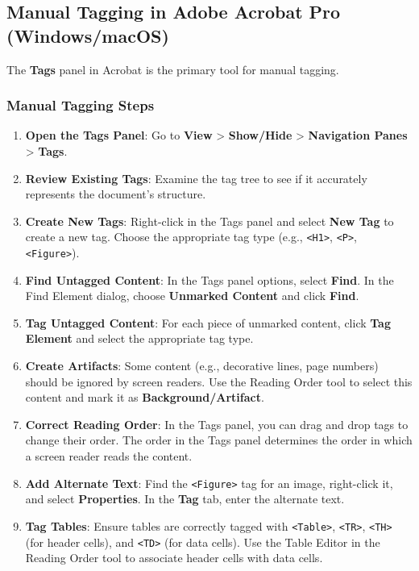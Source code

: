 \subsection{Manual Tagging in Adobe Acrobat Pro (Windows/macOS)}
\label{subsec:manual-tagging-acrobat}
The \textbf{Tags} panel in Acrobat is the primary tool for manual tagging.

\subsubsection{Manual Tagging Steps}
\label{ssubsec:manual-tagging-steps}
\begin{enumerate}
	\item \textbf{Open the Tags Panel}: Go to \textbf{View} > \textbf{Show/Hide} > \textbf{Navigation Panes} > \textbf{Tags}.
	\item \textbf{Review Existing Tags}: Examine the tag tree to see if it accurately represents the document's structure.
	\item \textbf{Create New Tags}: Right-click in the Tags panel and select \textbf{New Tag} to create a new tag. Choose the appropriate tag type (e.g., \texttt{<H1>}, \texttt{<P>}, \texttt{<Figure>}).
	\item \textbf{Find Untagged Content}: In the Tags panel options, select \textbf{Find}. In the Find Element dialog, choose \textbf{Unmarked Content} and click \textbf{Find}.
	\item \textbf{Tag Untagged Content}: For each piece of unmarked content, click \textbf{Tag Element} and select the appropriate tag type.
	\item \textbf{Create Artifacts}: Some content (e.g., decorative lines, page numbers) should be ignored by screen readers. Use the Reading Order tool to select this content and mark it as \textbf{Background/Artifact}.
	\item \textbf{Correct Reading Order}: In the Tags panel, you can drag and drop tags to change their order. The order in the Tags panel determines the order in which a screen reader reads the content.
	\item \textbf{Add Alternate Text}: Find the \texttt{<Figure>} tag for an image, right-click it, and select \textbf{Properties}. In the \textbf{Tag} tab, enter the alternate text.
	\item \textbf{Tag Tables}: Ensure tables are correctly tagged with \texttt{<Table>}, \texttt{<TR>}, \texttt{<TH>} (for header cells), and \texttt{<TD>} (for data cells). Use the Table Editor in the Reading Order tool to associate header cells with data cells.
\end{enumerate}

